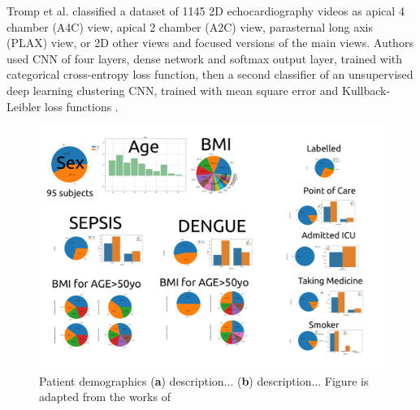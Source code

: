 Tromp et al. classified a dataset of 1145 2D echocardiography videos as apical 4 chamber (A4C) view, apical 2 chamber (A2C) view, parasternal long axis (PLAX) view, or 2D other views and focused versions of the main views. Authors used CNN of four layers, dense network and softmax output layer, trained with categorical cross-entropy loss function, then a second classifier of an unsupervised deep learning clustering CNN, trained with mean square error and Kullback-Leibler loss functions \cite{Tromp2022}.





\begin{figure}[h]
\includegraphics[width=\columnwidth]{../figures/patient-demographics-and-diseases/versions/drawing-v00}
\caption{
	Patient demographics
	(\textbf{a}) description...
	(\textbf{b}) description...
	Figure is adapted from the works of %
}
\end{figure}




